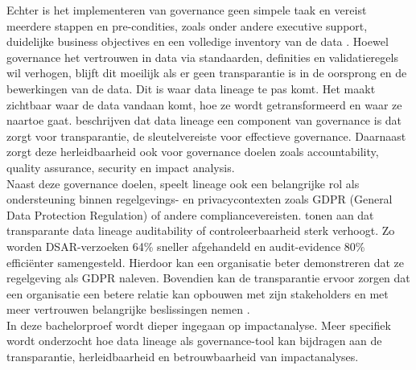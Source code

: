 Echter is het implementeren van governance geen simpele taak en vereist meerdere stappen en pre-condities, zoals onder andere executive support, duidelijke business objectives en een volledige inventory van de data \autocite{verma2024tracing}. Hoewel governance het vertrouwen in data via standaarden, definities en validatieregels wil verhogen, blijft dit moeilijk als er geen transparantie is in de oorsprong en de bewerkingen van de data. Dit is waar data lineage te pas komt. Het maakt zichtbaar waar de data vandaan komt, hoe ze wordt getransformeerd en waar ze naartoe gaat. \textcite{verma2024tracing} beschrijven dat data lineage een component van governance is dat zorgt voor transparantie, de sleutelvereiste voor effectieve governance. Daarnaast zorgt deze herleidbaarheid ook voor governance doelen zoals accountability, quality assurance, security en impact analysis.\\


Naast deze governance doelen, speelt lineage ook een belangrijke rol als ondersteuning binnen regelgevings- en privacycontexten zoals GDPR (General Data Protection Regulation) of andere compliancevereisten. \textcite{malviya2025dbt} tonen aan dat transparante data lineage auditability of controleerbaarheid sterk verhoogt. Zo worden DSAR-verzoeken 64\% sneller afgehandeld en audit-evidence 80\% efficiënter samengesteld. Hierdoor kan een organisatie beter demonstreren dat ze regelgeving als GDPR naleven. Bovendien kan de transparantie ervoor zorgen dat een organisatie een betere relatie kan opbouwen met zijn stakeholders en met meer vertrouwen belangrijke beslissingen nemen \autocite{verma2024tracing}.\\


In deze bachelorproef wordt dieper ingegaan op impactanalyse. Meer specifiek wordt onderzocht hoe data lineage als governance-tool kan bijdragen aan de transparantie, herleidbaarheid en betrouwbaarheid van impactanalyses.\\

